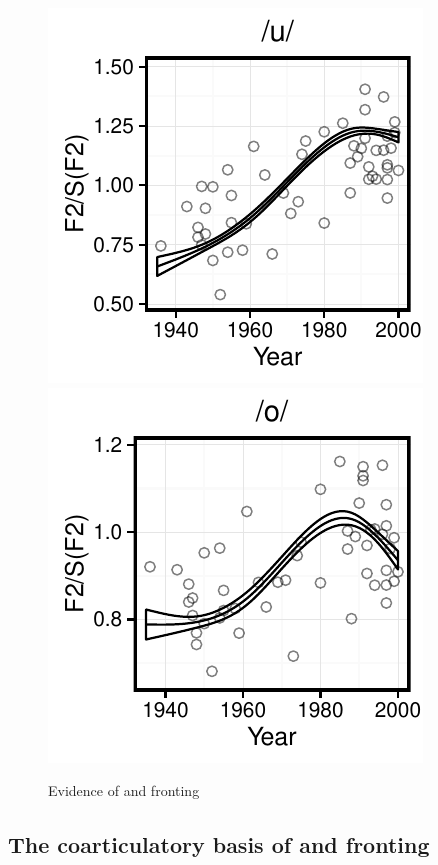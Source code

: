 \documentclass[12pt]{article}
\begin{document}
\begin{figure}[!htbp]
\centering
\includegraphics{uwchange}
\includegraphics{owchange}
\caption{Evidence of  and  fronting}
\end{figure}

\subsection{The coarticulatory basis of  and  fronting}
\end{document}
